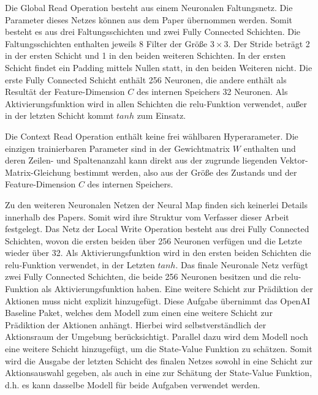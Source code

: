 Die Global Read Operation besteht aus einem Neuronalen Faltungsnetz. Die Parameter dieses Netzes können aus dem Paper übernommen werden. Somit besteht es aus drei Faltungsschichten und zwei Fully Connected Schichten. Die Faltungsschichten enthalten jeweils 8 Filter der Größe $3 \times 3$. Der Stride beträgt 2 in der ersten Schicht und 1 in den beiden weiteren Schichten. In der ersten Schicht findet ein Padding mittels Nullen statt, in den beiden Weiteren nicht. Die erste Fully Connected Schicht enthält 256 Neuronen, die andere enthält als Resultät der Feature-Dimension $C$ des internen Speichers 32 Neuronen. Als Aktivierungsfunktion wird in allen Schichten die relu-Funktion verwendet, außer in der letzten Schicht kommt $tanh$ zum Einsatz.

Die Context Read Operation enthält keine frei wählbaren Hyperarameter. Die einzigen trainierbaren Parameter sind in der Gewichtmatrix $W$ enthalten und deren Zeilen- und Spaltenanzahl kann direkt aus der zugrunde liegenden Vektor-Matrix-Gleichung bestimmt werden, also aus der Größe des Zustands und der Feature-Dimension $C$ des internen Speichers.

Zu den weiteren Neuronalen Netzen der Neural Map finden sich keinerlei Details innerhalb des Papers. Somit wird ihre Struktur vom Verfasser dieser Arbeit festgelegt. Das Netz der Local Write Operation besteht aus drei Fully Connected Schichten, wovon die ersten beiden über 256 Neuronen verfügen und die Letzte wieder über 32. Als Aktivierungsfunktion wird in den ersten beiden Schichten die relu-Funktion verwendet, in der Letzten $tanh$. Das finale Neuronale Netz verfügt zwei Fully Connected Schichten, die beide 256 Neuronen besitzen und die relu-Funktion als Aktivierungsfunktion haben. Eine weitere Schicht zur Prädiktion der Aktionen muss nicht explizit hinzugefügt. Diese Aufgabe übernimmt das OpenAI Baseline Paket, welches dem Modell zum einen eine weitere Schicht zur Prädiktion der Aktionen anhängt. Hierbei wird selbstverständlich der Aktionsraum der Umgebung berücksichtigt. Parallel dazu wird dem Modell noch eine weitere Schicht hinzugefügt, um die State-Value Funktion zu schätzen. Somit wird die Ausgabe der letzten Schicht des finalen Netzes sowohl in eine Schicht zur Aktionsauswahl gegeben, als auch in eine zur Schätung der State-Value Funktion, d.h. es kann dasselbe Modell für beide Aufgaben verwendet werden.

